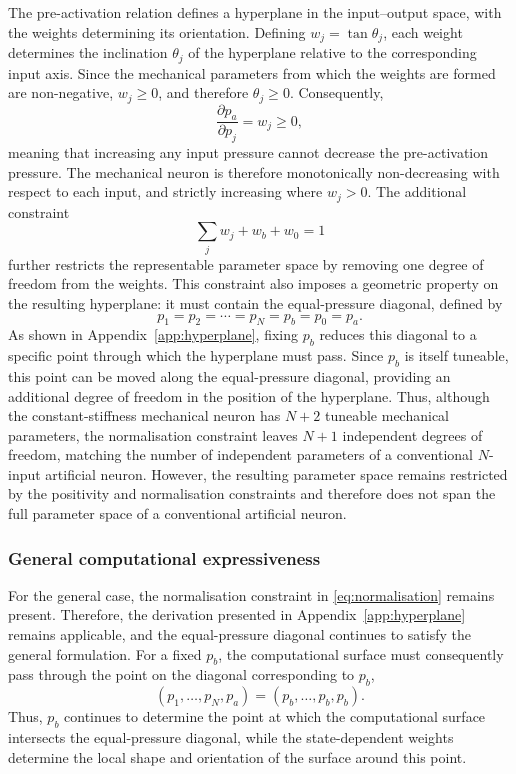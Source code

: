 \documentclass[11pt,a4paper]{article}
\numberwithin{equation}{section}
\begin{document}
The pre-activation relation defines a hyperplane in the input--output space, with the weights determining its
orientation. Defining $w_j = \tan\theta_j$, each weight determines the inclination $\theta_j$ of the hyperplane
relative to the corresponding input axis. Since the mechanical parameters from which the weights are formed are
non-negative, $w_j \geq 0$, and therefore $\theta_j \geq 0$. Consequently,
\begin{equation}
  \frac{\partial p_a}{\partial p_j} = w_j \geq 0,
  \label{eq:monotone}
\end{equation}
meaning that increasing any input pressure cannot decrease the pre-activation pressure. The mechanical neuron is
therefore monotonically non-decreasing with respect to each input, and strictly increasing where $w_j > 0$. The
additional constraint
\begin{equation}
  \sum_j w_j + w_b + w_0 = 1
  \label{eq:normalisation}
\end{equation}
further restricts the representable parameter space by removing one degree of freedom from the weights. This
constraint also imposes a geometric property on the resulting hyperplane: it must contain the equal-pressure
diagonal, defined by
\begin{equation}
  p_1 = p_2 = \cdots = p_N = p_b = p_0 = p_a .
  \label{eq:diagonal}
\end{equation}
As shown in Appendix~\ref{app:hyperplane}, fixing $p_b$ reduces this diagonal to a specific point through which the
hyperplane must pass. Since $p_b$ is itself tuneable, this point can be moved along the equal-pressure diagonal,
providing an additional degree of freedom in the position of the hyperplane. Thus, although the constant-stiffness
mechanical neuron has $N+2$ tuneable mechanical parameters, the normalisation constraint leaves $N+1$ independent
degrees of freedom, matching the number of independent parameters of a conventional $N$-input artificial neuron.
However, the resulting parameter space remains restricted by the positivity and normalisation constraints and
therefore does not span the full parameter space of a conventional artificial neuron.

\subsubsection{General computational expressiveness}

For the general case, the normalisation constraint in \cref{eq:normalisation} remains present. Therefore, the
derivation presented in Appendix~\ref{app:hyperplane} remains applicable, and the equal-pressure diagonal continues to
satisfy the general formulation. For a fixed $p_b$, the computational surface must consequently pass through the
point on the diagonal corresponding to $p_b$,
\begin{equation*}
  (p_1, \ldots, p_N, p_a) = (p_b, \ldots, p_b, p_b) .
\end{equation*}
Thus, $p_b$ continues to determine the point at which the computational surface intersects the equal-pressure
diagonal, while the state-dependent weights determine the local shape and orientation of the surface around this
point.
\end{document}
